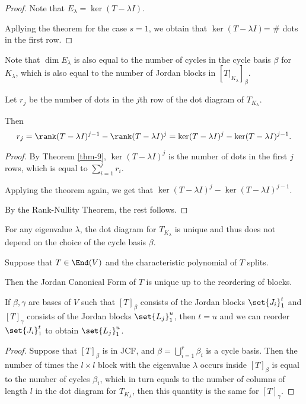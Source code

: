 \documentclass[11pt]{scrartcl}
\begin{document}
\begin{proof}
  \hfill

  Note that $E_{\lambda} = \ker (T-\lambda I)$.

  Apllying the theorem for the case $s = 1$, we obtain that $\ker (T-\lambda I) $= \# dots in the first row.
\end{proof}

\begin{remark}
  Note that $\dim E_{\lambda}$ is also equal to the number of cycles
  in the cycle basis $\beta$ for $K_{\lambda}$, which is also equal to
  the number of Jordan blocks in $[T|_{K_{\lambda}}]_{\beta}$.
\end{remark}

\begin{theorem}
  Let $r_j$ be the number of dots in the $j$th row of the dot diagram of $T_{K_{\lambda}}$.

  Then \[r_j = \rank (T- \lambda I)^{j-1} - \rank (T-\lambda I)^{j} = \ker (T-\lambda I)^j-\ker(T-\lambda I)^{j-1}.\]
\end{theorem}

\begin{proof}
  \hfill

  By Theorem \ref{thm-9}, $\ker (T-\lambda I)^{j}$ is the number of
  dots in the first $j$ rows, which is equal to $\sum_{i=1}^jr_i$.

  Applying the theorem again, we get that $\ker (T-\lambda I)^j-\ker(T-\lambda I)^{j-1}$.

  By the Rank-Nullity Theorem, the rest follows.
\end{proof}

\begin{corollary}
For any eigenvalue $\lambda$, the dot diagram for $T_{K_{\lambda}}$ is unique and thus does not depend on the choice of the cycle basis $\beta$.
\end{corollary}

\begin{corollary}
  Suppose that $T \in \End(V)$ and the characteristic polynomial of $T$ splits.

  Then the Jordan Canonical Form of $T$ is unique up to the reordering of blocks.

  If $\beta, \gamma$ are bases of $V$ such that $[T]_{\beta}$ consists of the Jordan blocks $\set{J_{i}}_1^t$ and $[T]_{\gamma}$ consists of the Jordan blocks $\set{L_j}_1^{u}$, then $t=u$ and we can reorder $\set{J_{i}}_1^t$ to obtain $\set{L_j}_1^{u}$.
\end{corollary}

\begin{proof}
  \hfill

  Suppose that $[T]_{\beta}$ is in JCF, and
  $\beta=\bigcup_{i=1}^{r} \beta_i$ is a cycle basis. Then the number
  of times the $l\times l$ block with the eigenvalue $\lambda$ occurs
  inside $[T]_{\beta}$ is equal to the number of cycles $\beta_{i}$,
  which in turn equals to the number of columns of length $l$ in the dot diagram for $T_{K_{\lambda}}$, then this quantity is the same for $[T]_{\gamma}$.
\end{proof}
\end{document}
